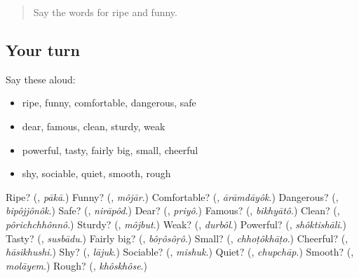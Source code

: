 \label{lesson:BN-R144-second-pass-describing-people}



\begin{quote}
Say the words for ripe and funny.
\end{quote}

\subsection*{Your turn}
Say these aloud:

\begin{itemize}
\raggedright
  \item ripe, funny, comfortable, dangerous, safe
  \item dear, famous, clean, sturdy, weak
  \item powerful, tasty, fairly big, small, cheerful
  \item shy, sociable, quiet, smooth, rough
\end{itemize}

\begin{tcolorbox}[breakable,colback=teal!4,colframe=teal!35!black,title={Before you move on}]
Ripe? (\textbf{}, \emph{pākā}.) Funny? (\textbf{}, \emph{môjār}.) Comfortable? (\textbf{}, \emph{ārāmdāyôk}.) Dangerous? (\textbf{}, \emph{bipôjjônôk}.) Safe? (\textbf{}, \emph{nirāpôd}.) Dear? (\textbf{}, \emph{priyô}.) Famous? (\textbf{}, \emph{bikhyātô}.) Clean? (\textbf{}, \emph{pôrichchhônnô}.) Sturdy? (\textbf{}, \emph{môjbut}.) Weak? (\textbf{}, \emph{durbôl}.) Powerful? (\textbf{}, \emph{shôktishāli}.) Tasty? (\textbf{}, \emph{susbādu}.) Fairly big? (\textbf{}, \emph{bôṛôsôṛô}.) Small? (\textbf{}, \emph{chhoṭôkhāṭo}.) Cheerful? (\textbf{}, \emph{hāsikhushi}.) Shy? (\textbf{}, \emph{lājuk}.) Sociable? (\textbf{}, \emph{mishuk}.) Quiet? (\textbf{}, \emph{chupchāp}.) Smooth? (\textbf{}, \emph{molāyem}.) Rough? (\textbf{}, \emph{khôskhôse}.)
\end{tcolorbox}
